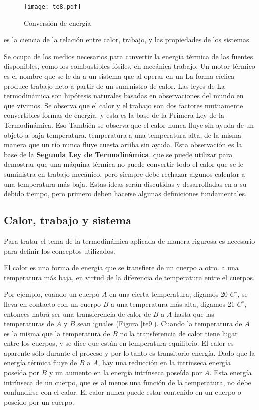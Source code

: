 \begin{figure}[h!]
    \centering
    \texttt{[image: te8.pdf]}
    \caption{Conversión de energía}
    \label{te8}
\end{figure}



\begin{definition}
    es la ciencia de la relación entre calor, trabajo,
y las propiedades de los sistemas.
\end{definition}

Se ocupa de los medios necesarios para convertir la energía térmica de las fuentes disponibles, 
como los combustibles fósiles, en mecánica
trabajo, Un motor térmico es el nombre que se le da a un sistema que al operar en un
La forma cíclica produce trabajo neto a partir de un suministro de calor. Las leyes de
La termodinámica son hipótesis naturales basadas en observaciones del mundo en
que vivimos. Se observa que el calor y el trabajo son dos factores mutuamente convertibles
formas de energía. y esta es la base de la Primera Ley de la Termodinámica. Eso
También se observa que el calor nunca fluye sin ayuda de un objeto a baja temperatura.
temperatura a una temperatura alta, de la misma manera que un río nunca fluye cuesta arriba sin ayuda. 
Esta observación es la base de la \textbf{Segunda Ley de Termodinámica}, que se puede utilizar para demostrar que una máquina 
térmica no puede convertir todo el calor que se le suministra en trabajo mecánico, pero siempre debe rechazar algunos
calentar a una temperatura más baja. Estas ideas serán discutidas y desarrolladas en
a su debido tiempo, pero primero deben hacerse algunas definiciones fundamentales.

\subsection{Calor, trabajo y sistema}

Para tratar el tema de la termodinámica aplicada de manera rigurosa es
necesario para definir los conceptos utilizados.

El calor es una forma de energía que se transfiere de un cuerpo a otro.
a una temperatura más baja, en virtud de la diferencia de temperatura entre el
cuerpos.

Por ejemplo, cuando un cuerpo $A$ en una cierta temperatura, digamos 20 $C^{\circ}$, se lleva
en contacto con un cuerpo $B$ a una temperatura más alta, digamos 21 $C^{\circ}$, entonces habrá
ser una transferencia de calor de $B$ a $A$ hasta que las temperaturas de $A$ y $B$ sean iguales
(Figura \ref{te9}). Cuando la temperatura de $A$ es la misma que la temperatura de $B$ no
la transferencia de calor tiene lugar entre los cuerpos, y se dice que están en temperatura
equilibrio. El calor es aparente sólo durante el proceso y por lo tanto es transitorio
energía. Dado que la energía térmica fluye de $B$ a $A$, hay una reducción en la intrínseca
energía poseída por $B$ y un aumento en la energía intrínseca poseída por $A$.
Esta energía intrínseca de un cuerpo, que es al menos una función de la temperatura,
no debe confundirse con el calor. El calor nunca puede estar contenido en un cuerpo o
poseído por un cuerpo.

